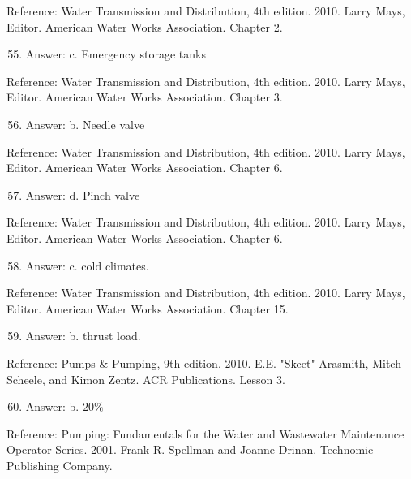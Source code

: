 \documentclass[10pt]{article}
\begin{document}
Reference: Water Transmission and Distribution, 4th edition. 2010. Larry Mays, Editor. American Water Works Association. Chapter 2.

\begin{enumerate}
  \setcounter{enumi}{54}
  \item Answer: c. Emergency storage tanks
\end{enumerate}

Reference: Water Transmission and Distribution, 4th edition. 2010. Larry Mays, Editor. American Water Works Association. Chapter 3.

\begin{enumerate}
  \setcounter{enumi}{55}
  \item Answer: b. Needle valve
\end{enumerate}

Reference: Water Transmission and Distribution, 4th edition. 2010. Larry Mays, Editor. American Water Works Association. Chapter 6.

\begin{enumerate}
  \setcounter{enumi}{56}
  \item Answer: d. Pinch valve
\end{enumerate}

Reference: Water Transmission and Distribution, 4th edition. 2010. Larry Mays, Editor. American Water Works Association. Chapter 6.

\begin{enumerate}
  \setcounter{enumi}{57}
  \item Answer: c. cold climates.
\end{enumerate}

Reference: Water Transmission and Distribution, 4th edition. 2010. Larry Mays, Editor. American Water Works Association. Chapter 15.

\begin{enumerate}
  \setcounter{enumi}{58}
  \item Answer: b. thrust load.
\end{enumerate}

Reference: Pumps \& Pumping, 9th edition. 2010. E.E. "Skeet" Arasmith, Mitch Scheele, and Kimon Zentz. ACR Publications. Lesson 3.

\begin{enumerate}
  \setcounter{enumi}{59}
  \item Answer: b. $20 \%$
\end{enumerate}

Reference: Pumping: Fundamentals for the Water and Wastewater Maintenance Operator Series. 2001. Frank R. Spellman and Joanne Drinan. Technomic Publishing Company.
\end{document}
